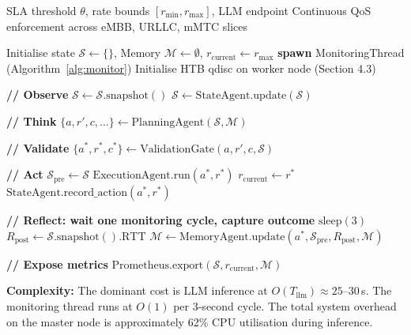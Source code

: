 \begin{algorithm}[H]
\caption{Autonomous Closed-Loop Orchestration}
\label{alg:loop}
\begin{algorithmic}[1]
\Require SLA threshold $\theta$, rate bounds $[r_{\min}, r_{\max}]$, LLM endpoint
\Ensure Continuous QoS enforcement across eMBB, URLLC, mMTC slices

\State Initialise state $\mathcal{S} \gets \{\}$, Memory $\mathcal{M} \gets \emptyset$, $r_{\text{current}} \gets r_{\max}$
\State \textbf{spawn} MonitoringThread (Algorithm~\ref{alg:monitor}) 
\State Initialise HTB qdisc on worker node (Section 4.3)

\Loop {}
  \State \textbf{// Observe}
  \State $\mathcal{S} \gets \mathcal{S}.\text{snapshot}()$ 
  \State $\mathcal{S} \gets \text{StateAgent.update}(\mathcal{S})$ 

  \State \textbf{// Think}
  \State $\{a, r', c, \ldots\} \gets \text{PlanningAgent}(\mathcal{S}, \mathcal{M})$ 

  \State \textbf{// Validate}
  \State $\{a^*, r^*, c^*\} \gets \text{ValidationGate}(a, r', c, \mathcal{S})$ 

    \State \textbf{// Act}
    \State $\mathcal{S}_{\text{pre}} \gets \mathcal{S}$
    \State $\text{ExecutionAgent.run}(a^*, r^*)$ 
    \State $r_{\text{current}} \gets r^*$
    \State $\text{StateAgent.record\_action}(a^*, r^*)$

    \State \textbf{// Reflect: wait one monitoring cycle, capture outcome}
    \State $\text{sleep}(3)$
    \State $R_{\text{post}} \gets \mathcal{S}.\text{snapshot}().\text{RTT}$
    \State $\mathcal{M} \gets \text{MemoryAgent.update}(a^*, \mathcal{S}_{\text{pre}}, R_{\text{post}}, \mathcal{M})$ 
  \EndIf

  \State \textbf{// Expose metrics}
  \State $\text{Prometheus.export}(\mathcal{S}, r_{\text{current}}, \mathcal{M})$
\EndLoop
\end{algorithmic}
\end{algorithm}

\textbf{Complexity:} The dominant cost is LLM inference at $O(T_{\text{llm}}) \approx 25$--$30$\,s. The monitoring thread runs at $O(1)$ per 3-second cycle. The total system overhead on the master node is approximately 62\% CPU utilisation during inference.
